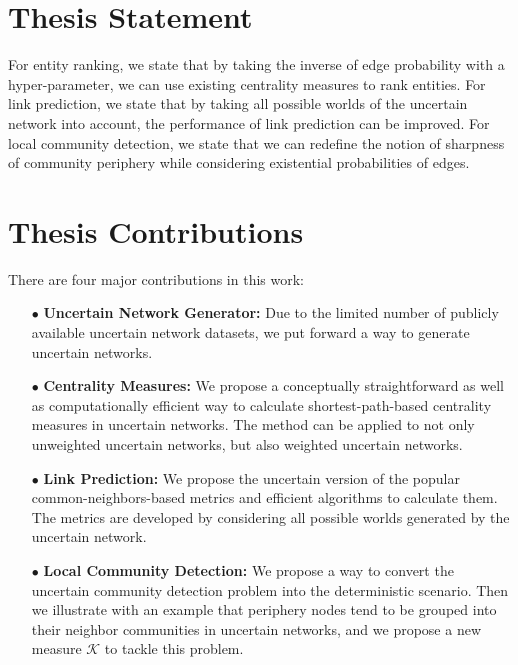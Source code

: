 \documentclass[\main/thesis.tex]{subfiles}
\begin{document}
\section{Thesis Statement}
For entity ranking, we state that by taking the inverse of edge probability with a hyper-parameter, we can use existing centrality measures to rank entities. For link prediction, we state that by taking all possible worlds of the uncertain network into account, the performance of link prediction can be improved. For local community detection, we state that we can redefine the notion of sharpness of community periphery while considering existential probabilities of edges. 

\section{Thesis Contributions}
There are four major contributions in this work:
\begin{enumerate}
\item[$\bullet$] \textbf{Uncertain Network Generator:}  Due to the limited number of publicly available uncertain network datasets, we put forward a way to generate uncertain networks.
\item[$\bullet$] \textbf{Centrality Measures:}  We propose a conceptually straightforward as well as computationally efficient way to calculate shortest-path-based centrality measures in uncertain networks. The method can be applied to not only unweighted uncertain networks, but also weighted uncertain networks.
\item[$\bullet$] \textbf{Link Prediction:}  We propose the uncertain version of the popular common-neighbors-based metrics and efficient algorithms to calculate them. The metrics are developed by considering all possible worlds generated by the uncertain network.
\item[$\bullet$] \textbf{Local Community Detection:} We propose a way to convert the uncertain community detection problem into the deterministic scenario. Then we illustrate with an example that periphery nodes tend to be grouped into their neighbor communities in uncertain networks, and we propose a new measure $\mathcal{K}$ to tackle this problem.

\end{enumerate}
\end{document}
